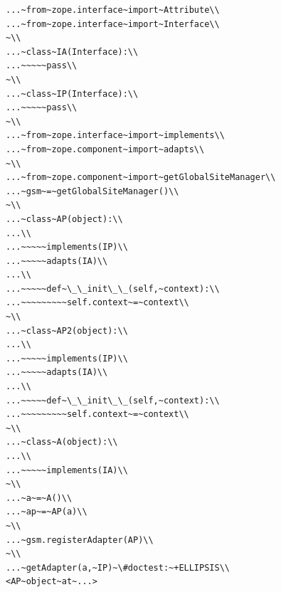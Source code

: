 \documentclass[a4paper,openany,twoside,draft]{book}
\begin{document}
\begin{verbatim}
...~from~zope.interface~import~Attribute\\
...~from~zope.interface~import~Interface\\
~\\
...~class~IA(Interface):\\
...~~~~~pass\\
~\\
...~class~IP(Interface):\\
...~~~~~pass\\
~\\
...~from~zope.interface~import~implements\\
...~from~zope.component~import~adapts\\
~\\
...~from~zope.component~import~getGlobalSiteManager\\
...~gsm~=~getGlobalSiteManager()\\
~\\
...~class~AP(object):\\
...\\
...~~~~~implements(IP)\\
...~~~~~adapts(IA)\\
...\\
...~~~~~def~\_\_init\_\_(self,~context):\\
...~~~~~~~~~self.context~=~context\\
~\\
...~class~AP2(object):\\
...\\
...~~~~~implements(IP)\\
...~~~~~adapts(IA)\\
...\\
...~~~~~def~\_\_init\_\_(self,~context):\\
...~~~~~~~~~self.context~=~context\\
~\\
...~class~A(object):\\
...\\
...~~~~~implements(IA)\\
~\\
...~a~=~A()\\
...~ap~=~AP(a)\\
~\\
...~gsm.registerAdapter(AP)\\
~\\
...~getAdapter(a,~IP)~\#doctest:~+ELLIPSIS\\
<AP~object~at~...>
\end{verbatim}
\end{document}

